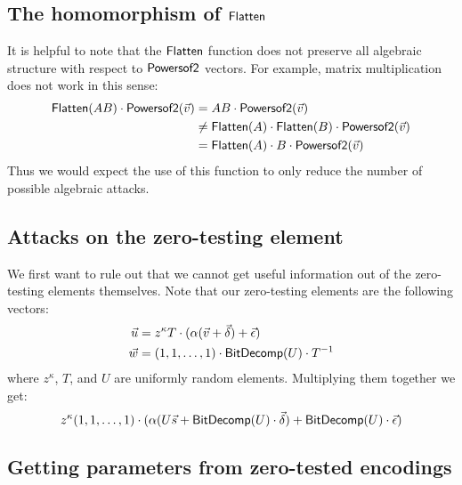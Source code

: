 \subsection{The homomorphism of $\mathsf{Flatten}$}

It is helpful to note that the $\mathsf{Flatten}$ function does not preserve all algebraic structure with respect to $\mathsf{Powersof2}$ vectors.  For example, matrix multiplication does not work in this sense:
\begin{align*}
\mathsf{Flatten}(AB)\cdot \mathsf{Powersof2}(\vec{v}) &= AB \cdot \mathsf{Powersof2}(\vec{v})\\
&\not= \mathsf{Flatten}(A)\cdot \mathsf{Flatten}(B)\cdot \mathsf{Powersof2}(\vec{v})\\ 
&= \mathsf{Flatten}(A)\cdot B\cdot \mathsf{Powersof2}(\vec{v})
\end{align*}
Thus we would expect the use of this function to only reduce the number of possible algebraic attacks.

\subsection{Attacks on the zero-testing element}

We first want to rule out that we cannot get useful information out of the zero-testing elements themselves.  Note that our zero-testing elements are the following vectors:
\begin{align*}
\vec{u} &= z^\kappa T\cdot (\alpha (\vec{v} + \vec{\delta}) + \vec{\epsilon})\\
\vec{w} &= (1,1,\ldots, 1)\cdot\mathsf{BitDecomp}(U)\cdot T^{-1}
\end{align*}
where $z^\kappa$, $T$, and $U$ are uniformly random elements.  Multiplying them together we get:
$$z^\kappa (1,1,\ldots, 1)\cdot (\alpha (U\vec{s} + \mathsf{BitDecomp}(U)\cdot\vec{\delta}) + \mathsf{BitDecomp}(U)\cdot\vec{\epsilon})$$

\subsection{Getting parameters from zero-tested encodings}

